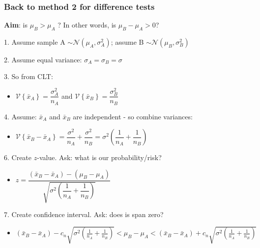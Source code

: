 \begin{frame}\frametitle{Back to method 2 for difference tests}

	\textbf{Aim}: is $\mu_B > \mu_A$ ? In other words, is $\mu_B - \mu_A > 0$?

	1. Assume sample A $\sim \mathcal{N}\left(\mu_A, \sigma^2_A\right)$; assume B $\sim \mathcal{N}\left(\mu_B, \sigma^2_B\right)$

	2. Assume equal variance: $\sigma_A = \sigma_B = \sigma$

	3. So from CLT:
	\begin{itemize}
		\item $\mathcal{V}\left\{\bar{x}_A\right\} = \dfrac{\sigma^2_A}{n_A}$ and $\mathcal{V}\left\{\bar{x}_B\right\} = \dfrac{\sigma^2_B}{n_B}$
	\end{itemize}

	4. Assume: $\bar{x}_A$ and $\bar{x}_B$ are independent - so combine variances:
	\begin{itemize}
		\item $\mathcal{V}\left\{\bar{x}_B - \bar{x}_A\right\} = \dfrac{\sigma^2}{n_A} + \dfrac{\sigma^2}{n_B} = \sigma^2 \left(\dfrac{1}{n_A} + \dfrac{1}{n_B}\right)$
	\end{itemize}

	6. Create $z$-value. Ask: what is our probability/risk?
	\begin{itemize}
		\item$z = \dfrac{(\bar{x}_B - \bar{x}_A) - (\mu_B - \mu_A)}{\sqrt{\sigma^2 \left(\dfrac{1}{n_A} + \dfrac{1}{n_B}\right)}}$
	\end{itemize}

	7. Create confidence interval. Ask: does is span zero?
	\begin{itemize}
		\item$(\bar{x}_B - \bar{x}_A) - c_n \sqrt{\sigma^2 (\tfrac{1}{n_A} + \tfrac{1}{n_B})} < \mu_B - \mu_A < (\bar{x}_B - \bar{x}_A) + c_n \sqrt{\sigma^2 (\tfrac{1}{n_A} + \tfrac{1}{n_B})}$
	\end{itemize}
\end{frame}

